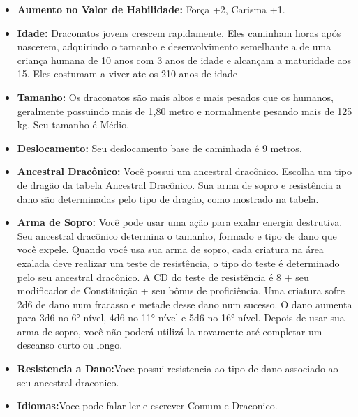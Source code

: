 \documentclass{book}
\begin{document}
\begin{itemize}
\item \textbf{Aumento no Valor de Habilidade:} Força +2, Carisma +1.
\item \textbf{Idade:} Draconatos jovens crescem rapidamente. Eles caminham horas após 
      nascerem, adquirindo o tamanho e desenvolvimento semelhante a de uma criança humana
      de 10 anos com 3 anos de idade e alcançam a maturidade aos 15. Eles costumam a viver ate 
      os 210 anos de idade 
\item \textbf{Tamanho:} Os draconatos são mais altos e mais pesados que os humanos, geralmente 
      possuindo mais de 1,80 metro e normalmente pesando mais de 125 kg. Seu tamanho é Médio.
  \item \textbf{Deslocamento:} Seu deslocamento base de caminhada é 9 metros.
  \item \textbf{Ancestral Dracônico:} Você possui um ancestral dracônico. Escolha um tipo de 
       dragão da tabela Ancestral Dracônico. Sua arma de sopro e resistência a dano são
       determinadas pelo tipo de dragão, como mostrado na tabela.
  \item \textbf{Arma de Sopro:} Você pode usar uma ação para exalar energia destrutiva. Seu 
       ancestral dracônico determina o tamanho, formado e tipo de dano que você
       expele. Quando você usa sua arma de sopro, cada criatura na área exalada deve realizar 
       um teste de resistência, o tipo do teste é determinado pelo seu ancestral 
       dracônico. A CD do teste de resistência é 8 + seu modificador de Constituição + seu   
       bônus de  proficiência. Uma criatura sofre 2d6 de dano num fracasso e metade desse dano 
       num sucesso. O dano aumenta para 3d6 no 6° nível, 4d6 no 11° nível e 5d6 no 16° nível.
       Depois de usar sua arma de sopro, você não poderá utilizá-la novamente até completar um
       descanso curto ou longo.
  \item \textbf{Resistencia a Dano:}Voce possui resistencia ao tipo de dano associado ao seu 
      ancestral draconico.
  \item \textbf{Idiomas:}Voce pode falar ler e escrever Comum e Draconico.
\end{itemize}
\end{document}
